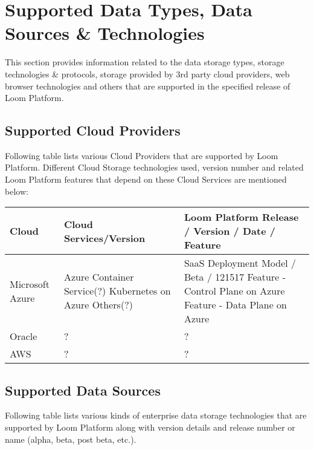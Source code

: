 \documentclass[letterpaper,10pt,english]{sphinxmanual}
\begin{document}
\section{Supported Data Types, Data Sources \& Technologies}
\label{\detokenize{loom_getting_started_guide:supported-data-types-data-sources-technologies}}\label{\detokenize{loom_getting_started_guide:content-mcdmp-supports-tech-specs}}
This section provides information related to the data storage types, storage technologies \& protocols, storage provided by 3rd party cloud providers, web browser technologies and others that are supported in the specified release of Loom Platform.


\subsection{Supported Cloud Providers}
\label{\detokenize{loom_getting_started_guide:supported-cloud-providers}}
Following table lists various Cloud Providers that are supported by Loom Platform.  Different Cloud Storage technologies used, version number and related Loom Platform features that depend on these Cloud Services are mentioned below:


\begin{savenotes}\sphinxattablestart
\centering
\begin{tabulary}{\linewidth}[t]{|T|T|T|}
\hline

Cloud
&
Cloud Services/Version
&
Loom Platform Release / Version / Date / Feature
\\
\hline
Microsoft
Azure
&
Azure Container Service(?)
Kubernetes on Azure
Others(?)
&
SaaS Deployment Model / Beta / 121517
Feature - Control Plane on Azure
Feature - Data Plane on Azure
\\
\hline
Oracle
&
?
&
?
\\
\hline
AWS
&
?
&
?
\\
\hline
\end{tabulary}
\par
\sphinxattableend\end{savenotes}


\subsection{Supported Data Sources}
\label{\detokenize{loom_getting_started_guide:supported-data-sources}}
Following table lists various kinds of enterprise data storage technologies that are supported by Loom Platform along with version details and release number or name (alpha, beta, post beta, etc.).
\end{document}

